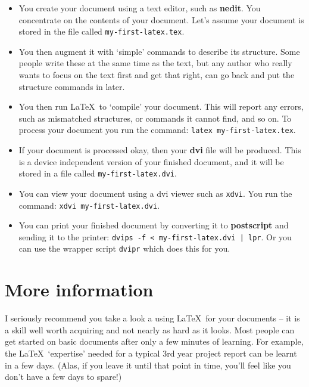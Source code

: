 \documentclass[12pt,a4paper]{article}
\begin{document}
\begin{itemize}


\item You create your document using a text editor, such as \textbf{nedit}.
You concentrate on the contents of your document. Let's assume your document
is stored in the file called \texttt{my-first-latex.tex}.

\item You then augment it with `simple' commands to describe its structure.
Some people write these at the same time as the text, but any author who
really wants to focus on the text first and get that right, can go back and
put the structure commands in later.

\item You then run \LaTeX\ to `compile' your document. This will report any
errors, such as mismatched structures, or commands it cannot find, and so on.
To process your document you run the command: \texttt{latex
my-first-latex.tex}.

\item If your document is processed okay, then your \textbf{dvi} file will be
produced. This is a device independent version of your finished document, and
it will be stored in a file called \texttt{my-first-latex.dvi}.

\item You can view your document using a dvi viewer such as \texttt{xdvi}. You
run the command: \texttt{xdvi my-first-latex.dvi}.

\item You can print your finished document by converting it to
\textbf{postscript} and sending it to the printer: \texttt{dvips -f <
my-first-latex.dvi | lpr}. Or you can use the wrapper script \texttt{dvipr}
which does this for you.

\end{itemize}


\section{More information}

I seriously recommend you take a look a using \LaTeX\ for your documents -- it
is a skill well worth acquiring and not nearly as hard as it looks. Most
people can get started on basic documents after only a few minutes of
learning. For example, the \LaTeX\ `expertise' needed for a typical 3rd year
project report can be learnt in a few days. (Alas, if you leave it until that
point in time, you'll feel like you don't have a few days to spare!)
\end{document}

